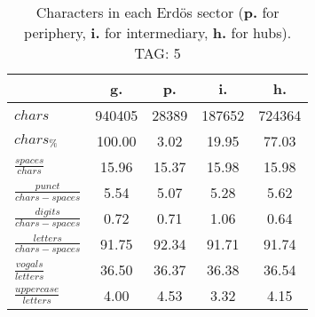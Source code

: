 \begin{table}[h!]
\begin{center}
\begin{tabular}{| l || c | c | c | c |}\hline
 & {\bf g.} & {\bf p.} & {\bf i.} & {\bf h.} \\\hline\hline
$chars$ & 940405  & 28389  & 187652  & 724364 \\
$chars_{\%}$ & 100.00  & 3.02  & 19.95  & 77.03 \\\hline
$\frac{spaces}{chars}$ & 15.96  & 15.37  & 15.98  & 15.98 \\
$\frac{punct}{chars-spaces}$ & 5.54  & 5.07  & 5.28  & 5.62 \\
$\frac{digits}{chars-spaces}$ & 0.72  & 0.71  & 1.06  & 0.64 \\\hline
$\frac{letters}{chars-spaces}$ & 91.75  & 92.34  & 91.71  & 91.74 \\
$\frac{vogals}{letters}$ & 36.50  & 36.37  & 36.38  & 36.54 \\
$\frac{uppercase}{letters}$ & 4.00  & 4.53  & 3.32  & 4.15 \\\hline
\end{tabular}
\caption{Characters in each Erd\"os sector ({{\bf p.}} for periphery, {{\bf i.}} for intermediary, 
    {{\bf h.}} for hubs). TAG: 5}
\end{center}
\end{table}